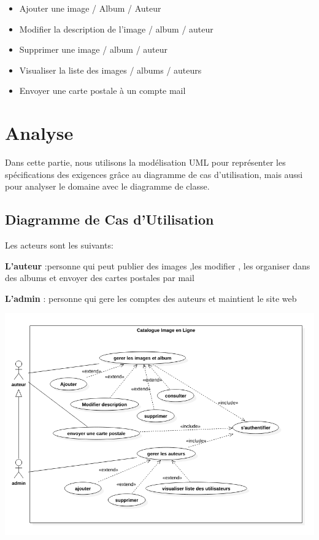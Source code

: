 \documentclass[12pt]{article}
\begin{document}
	\begin{itemize}
	\item Ajouter une image / Album / Auteur
	\item Modifier la description de l'image / album / auteur 
	\item Supprimer une image / album / auteur
	\item Visualiser la liste des images / albums / auteurs 
	\item Envoyer une carte postale à un compte mail
	\end{itemize}
	
	
     

   
    
	
	
	
	\newpage
	\section{Analyse}
	Dans cette partie, nous utilisons la modélisation UML pour représenter les spécifications des exigences grâce au diagramme de cas d’utilisation, mais aussi pour analyser le domaine avec le diagramme de classe.
	\subsection{Diagramme de Cas d'Utilisation}
	Les acteurs sont les suivants:
	
	\textbf{L'auteur} :personne qui peut publier des images ,les modifier , les organiser dans des albums  et envoyer des cartes postales par mail
	
	\textbf{L'admin} : personne qui gere les comptes des auteurs  et maintient le site web 
	\vspace{1.5cm}
	
	
	\includegraphics[scale =0.5 ,width=\textwidth]{usecase.png}
	
\end{document}
